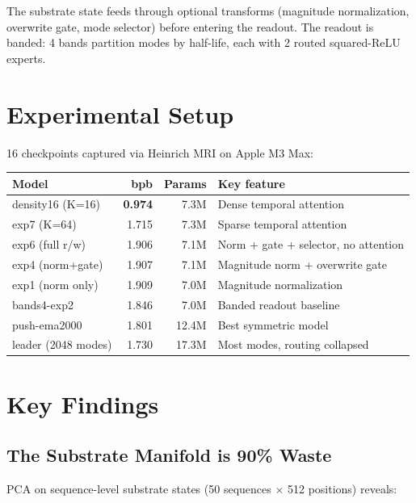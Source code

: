 \documentclass[11pt,a4paper]{report}
\begin{document}
The substrate state feeds through optional transforms (magnitude normalization, overwrite gate, mode selector) before entering the readout. The readout is banded: 4 bands partition modes by half-life, each with 2 routed squared-ReLU experts.

\section{Experimental Setup}

16 checkpoints captured via Heinrich MRI on Apple M3 Max:

\begin{table}[h]
\centering
\small
\begin{tabular}{lrrl}
\toprule
\textbf{Model} & \textbf{bpb} & \textbf{Params} & \textbf{Key feature} \\
\midrule
density16 (K=16) & \textbf{0.974} & 7.3M & Dense temporal attention \\
exp7 (K=64) & 1.715 & 7.3M & Sparse temporal attention \\
exp6 (full r/w) & 1.906 & 7.1M & Norm + gate + selector, no attention \\
exp4 (norm+gate) & 1.907 & 7.1M & Magnitude norm + overwrite gate \\
exp1 (norm only) & 1.909 & 7.0M & Magnitude normalization \\
bands4-exp2 & 1.846 & 7.0M & Banded readout baseline \\
push-ema2000 & 1.801 & 12.4M & Best symmetric model \\
leader (2048 modes) & 1.730 & 17.3M & Most modes, routing collapsed \\
\bottomrule
\end{tabular}
\end{table}

\section{Key Findings}

\subsection{The Substrate Manifold is 90\% Waste}

PCA on sequence-level substrate states (50 sequences $\times$ 512 positions) reveals:
\end{document}
